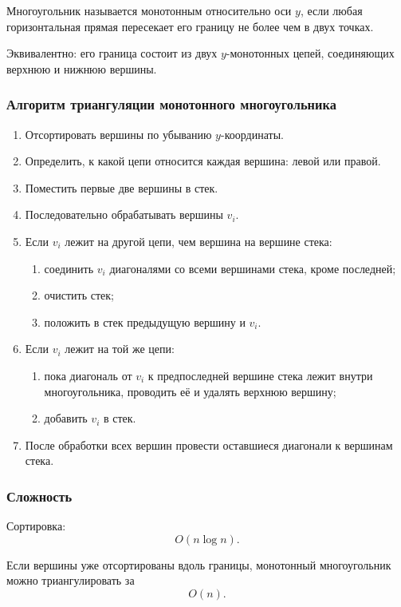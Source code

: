\documentclass[12pt,a4paper]{article}
\begin{document}
Многоугольник называется монотонным относительно оси \(y\), если любая горизонтальная прямая пересекает его границу не более чем в двух точках.

Эквивалентно: его граница состоит из двух \(y\)-монотонных цепей, соединяющих верхнюю и нижнюю вершины.

\subsubsection{Алгоритм триангуляции монотонного многоугольника}

\begin{enumerate}
    \item Отсортировать вершины по убыванию \(y\)-координаты.
    \item Определить, к какой цепи относится каждая вершина: левой или правой.
    \item Поместить первые две вершины в стек.
    \item Последовательно обрабатывать вершины \(v_i\).
    \item Если \(v_i\) лежит на другой цепи, чем вершина на вершине стека:
    \begin{enumerate}
        \item соединить \(v_i\) диагоналями со всеми вершинами стека, кроме последней;
        \item очистить стек;
        \item положить в стек предыдущую вершину и \(v_i\).
    \end{enumerate}
    \item Если \(v_i\) лежит на той же цепи:
    \begin{enumerate}
        \item пока диагональ от \(v_i\) к предпоследней вершине стека лежит внутри многоугольника, проводить её и удалять верхнюю вершину;
        \item добавить \(v_i\) в стек.
    \end{enumerate}
    \item После обработки всех вершин провести оставшиеся диагонали к вершинам стека.
\end{enumerate}

\subsubsection{Сложность}

Сортировка:
\[
O(n\log n).
\]

Если вершины уже отсортированы вдоль границы, монотонный многоугольник можно триангулировать за
\[
O(n).
\]
\end{document}
